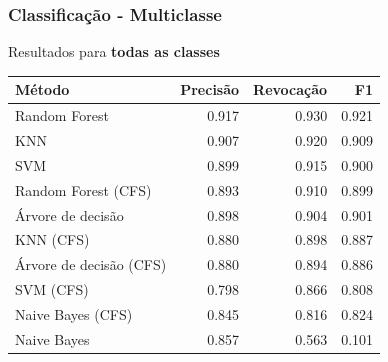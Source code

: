 \documentclass[t]{beamer}
\begin{document}
\begin{frame}[c]
	\frametitle{Classificação - Multiclasse}

	\centering
	Resultados para \textbf{todas as classes}

	\small{
	\begin{table}[h]
		\centering
		\begin{tabulary}{\linewidth}{|L|R|R|R|}
			\hline
			\textbf{Método} & \textbf{Precisão} & \textbf{Revocação} & \textbf{F1} \\ \hline
			Random Forest          & 0.917 & 0.930 & 0.921 \\ \hline
			KNN                     & 0.907 & 0.920 & 0.909 \\ \hline
			SVM                     & 0.899 & 0.915 & 0.900 \\ \hline
			Random Forest (CFS)     & 0.893 & 0.910 & 0.899 \\ \hline
			Árvore de decisão             & 0.898 & 0.904 & 0.901 \\ \hline
			KNN (CFS)               & 0.880 & 0.898 & 0.887 \\ \hline
			Árvore de decisão (CFS) & 0.880 & 0.894 & 0.886 \\ \hline
			SVM (CFS)               & 0.798 & 0.866 & 0.808 \\ \hline
			Naive Bayes (CFS)       & 0.845 & 0.816 & 0.824 \\ \hline
			Naive Bayes             & 0.857 & 0.563 & 0.101 \\ \hline
		\end{tabulary}
	\end{table}
	}
\end{frame}
\end{document}

